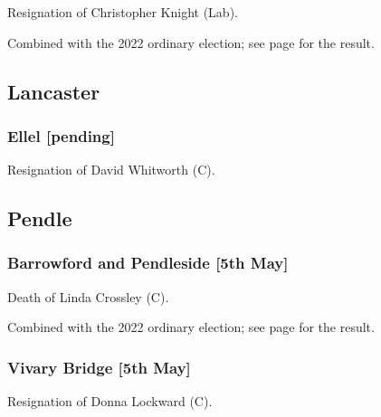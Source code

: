 \documentclass[a4paper,openany]{book}
\begin{document}
\begin{resultsiii}

Resignation of Christopher Knight (Lab).

Combined with the 2022 ordinary election; see page \pageref{HyndburnStOswalds} for the result.

\subsection*{Lancaster}

\subsubsection*{Ellel \hspace*{\fill}\nolinebreak[1]%
	\enspace\hspace*{\fill}
	[pending]}


Resignation of David Whitworth (C).

\subsection*{Pendle}

\subsubsection*{Barrowford and Pendleside \hspace*{\fill}\nolinebreak[1]%
	\enspace\hspace*{\fill}
	[5th May]}


Death of Linda Crossley (C).

Combined with the 2022 ordinary election; see page \pageref{PendleBarrowfordPendleside} for the result.

\subsubsection*{Vivary Bridge \hspace*{\fill}\nolinebreak[1]%
	\enspace\hspace*{\fill}
	[5th May]}


Resignation of Donna Lockward (C).


\end{resultsiii}
\end{document}
